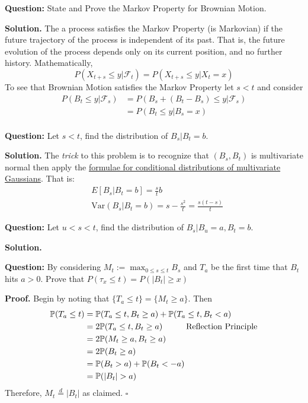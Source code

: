 \documentclass{article}
\begin{document}
\begin{tcolorbox}[colframe=black,colback=gray!5,boxrule=0.5pt]
\textbf{Question:} State and Prove the Markov Property for Brownian Motion.
\end{tcolorbox}
\textbf{Solution.} The a process satisfies the Markov Property (is Markovian) if the future trajectory of the process is independent of its past. That is, the future evolution of the process depends only on its current position, and no further history. Mathematically, 
$$P(X_{t+s} \leq y| \mathcal{F}_t) = P(X_{t+s} \leq y| X_t=x)$$
To see that Brownian Motion satisfies the Markov Property let $s <t$ and consider 
\begin{align*}
    P(B_t \leq y| \mathcal{F}_s) &= P(B_s + (B_t-B_s) \leq y|\mathcal{F}_s) \\
    &= P(B_t \leq y| B_s =x) \\
\end{align*}

\begin{tcolorbox}[colframe=black,colback=gray!5,boxrule=0.5pt]
\textbf{Question:} Let $s < t$, find the distribution of $B_s | B_t = b$.
\end{tcolorbox}
\textbf{Solution.} The \textit{trick} to this problem is to recognize that $(B_s, B_t)$ is multivariate normal then apply the \href{https://online.stat.psu.edu/stat505/lesson/6/6.1}{formulae for conditional distributions of multivariate Gaussians}. That is: 
\begin{align*}
    & E[B_s | B_t=b] = \frac{s}{t}b \\
    &\text{Var}(B_s | B_t=b) = s-\frac{s^2}{t} = \frac{s(t-s)}{t}
\end{align*}

\begin{tcolorbox}[colframe=black,colback=gray!5,boxrule=0.5pt]

\textbf{Question:} Let $u<s < t$, find the distribution of $B_s | B_u=a,B_t = b$.
\end{tcolorbox}
\textbf{Solution.} 


\begin{tcolorbox}[colframe=black,colback=gray!5,boxrule=0.5pt]
\textbf{Question:} By considering $M_t := \max_{0\leq s \leq t} B_s$ and $T_a$ be the first time that $B_t$ hits $a > 0$. Prove that $P(\tau_x\leq t) = P(|B_t|\geq x)$  
\end{tcolorbox}
\textbf{Proof.} Begin by noting that $\{T_a\leq t\} = \{M_t\geq a\}$. Then
\begin{align*}
    \mathbb{P}(T_a\leq t) &= \mathbb{P}(T_a\leq t, B_t\geq a) + \mathbb{P}(T_a\leq t, B_t< a) \\
    &= 2\mathbb{P}(T_a\leq t, B_t\geq a) \hspace{10mm} \text{Reflection Principle} \\
    &= 2\mathbb{P}(M_t\geq a, B_t\geq a) \\
    &= 2\mathbb{P}(B_t\geq a) \\
    &= \mathbb{P}(B_t> a) + \mathbb{P}(B_t <-a) \\
    &= \mathbb{P}(|B_t| > a)
\end{align*}
Therefore, $M_t \stackrel{d}{=} |B_t|$ as claimed. $\square$
\end{document}
